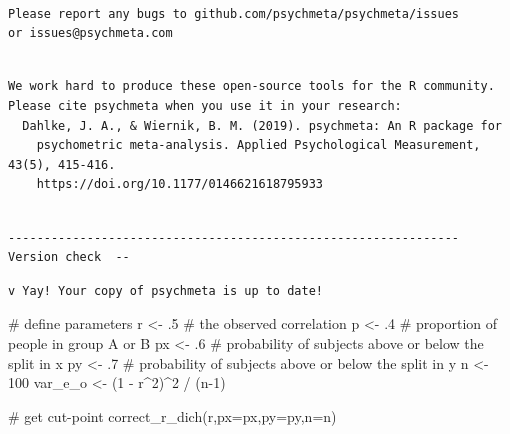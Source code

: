 \documentclass[
  letterpaper,
  DIV=11,
  numbers=noendperiod]{scrreprt}
\newenvironment{Shaded}{\begin{snugshade}}{\end{snugshade}}
\newcommand{\AttributeTok}[1]{\textcolor[rgb]{0.40,0.45,0.13}{#1}}
\newcommand{\CommentTok}[1]{\textcolor[rgb]{0.37,0.37,0.37}{#1}}
\newcommand{\DecValTok}[1]{\textcolor[rgb]{0.68,0.00,0.00}{#1}}
\newcommand{\FunctionTok}[1]{\textcolor[rgb]{0.28,0.35,0.67}{#1}}
\newcommand{\NormalTok}[1]{\textcolor[rgb]{0.00,0.23,0.31}{#1}}
\newcommand{\OtherTok}[1]{\textcolor[rgb]{0.00,0.23,0.31}{#1}}
\newcommand{\SpecialCharTok}[1]{\textcolor[rgb]{0.37,0.37,0.37}{#1}}
\begin{document}
\begin{verbatim}

Please report any bugs to github.com/psychmeta/psychmeta/issues
or issues@psychmeta.com
\end{verbatim}

\begin{verbatim}

We work hard to produce these open-source tools for the R community.
Please cite psychmeta when you use it in your research:
  Dahlke, J. A., & Wiernik, B. M. (2019). psychmeta: An R package for
    psychometric meta-analysis. Applied Psychological Measurement, 43(5), 415-416.
    https://doi.org/10.1177/0146621618795933
\end{verbatim}

\begin{verbatim}

---------------------------------------------------------------  Version check  --
\end{verbatim}

\begin{verbatim}
v Yay! Your copy of psychmeta is up to date!
\end{verbatim}

\begin{Shaded}
\begin{Highlighting}[]
\CommentTok{\# define parameters}
\NormalTok{r }\OtherTok{\textless{}{-}}\NormalTok{ .}\DecValTok{5} \CommentTok{\# the observed correlation}
\NormalTok{p }\OtherTok{\textless{}{-}}\NormalTok{ .}\DecValTok{4}  \CommentTok{\# proportion of people in group A or B}
\NormalTok{px }\OtherTok{\textless{}{-}}\NormalTok{ .}\DecValTok{6} \CommentTok{\# probability of subjects above or below the split in x}
\NormalTok{py }\OtherTok{\textless{}{-}}\NormalTok{ .}\DecValTok{7} \CommentTok{\# probability of subjects above or below the split in y}
\NormalTok{n }\OtherTok{\textless{}{-}} \DecValTok{100}
\NormalTok{var\_e\_o }\OtherTok{\textless{}{-}}\NormalTok{ (}\DecValTok{1} \SpecialCharTok{{-}}\NormalTok{ r}\SpecialCharTok{\^{}}\DecValTok{2}\NormalTok{)}\SpecialCharTok{\^{}}\DecValTok{2} \SpecialCharTok{/}\NormalTok{ (n}\DecValTok{{-}1}\NormalTok{)}

\CommentTok{\# get cut{-}point}
\FunctionTok{correct\_r\_dich}\NormalTok{(r,}\AttributeTok{px=}\NormalTok{px,}\AttributeTok{py=}\NormalTok{py,}\AttributeTok{n=}\NormalTok{n)}
\end{Highlighting}
\end{Shaded}
\end{document}
